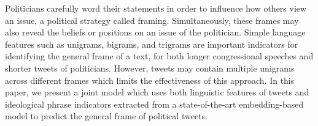 Politicians carefully word their statements in order to influence how others view an issue, a political strategy called framing. Simultaneously, these frames may also reveal the beliefs or positions on an issue of the politician. Simple language features such as unigrams, bigrams, and trigrams are important indicators for identifying the general frame of a text, for both longer congressional speeches and shorter tweets of politicians. However, tweets may contain multiple unigrams across different frames which limits the effectiveness of this approach. In this paper, we present a joint model which uses both linguistic features of tweets and ideological phrase indicators extracted from a state-of-the-art embedding-based model to predict the general frame of political tweets.
